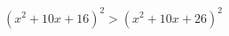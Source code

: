\begin{ex}[type=inequality]
	\begin{condition}
		$(x^2 + 10x + 16)^2>(x^2+ 10x + 26)^2  $
	\end{condition}
\end{ex}